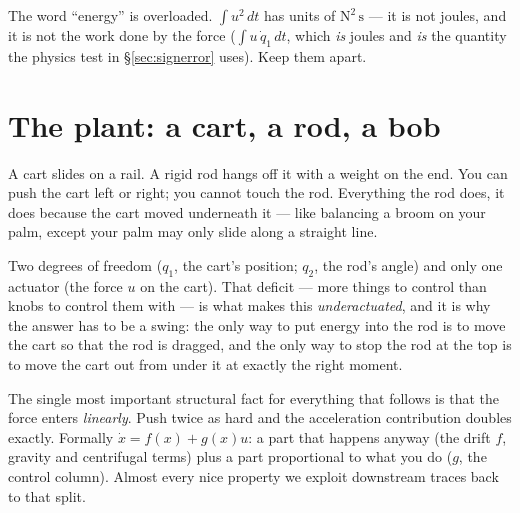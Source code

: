 \documentclass[11pt]{article}
\begin{document}
\begin{warn}
The word ``energy'' is overloaded. $\int u^2\,dt$ has units of
$\mathrm{N^2\,s}$ --- it is not joules, and it is not the work done by the
force ($\int u\,\dot q_1\,dt$, which \emph{is} joules and \emph{is} the quantity
the physics test in \S\ref{sec:signerror} uses). Keep them apart.
\end{warn}

\section{The plant: a cart, a rod, a bob}

\begin{eli}
A cart slides on a rail. A rigid rod hangs off it with a weight on the end. You
can push the cart left or right; you cannot touch the rod. Everything the rod
does, it does because the cart moved underneath it --- like balancing a broom on
your palm, except your palm may only slide along a straight line.
\end{eli}

\begin{intu}
Two degrees of freedom ($q_1$, the cart's position; $q_2$, the rod's angle) and
only one actuator (the force $u$ on the cart). That deficit --- more things to
control than knobs to control them with --- is what makes this
\emph{underactuated}, and it is why the answer has to be a swing: the only way to
put energy into the rod is to move the cart so that the rod is dragged, and the
only way to stop the rod at the top is to move the cart out from under it at
exactly the right moment.

The single most important structural fact for everything that follows is that
the force enters \emph{linearly}. Push twice as hard and the acceleration
contribution doubles exactly. Formally $\dot x = f(x)+g(x)u$: a part that happens
anyway (the drift $f$, gravity and centrifugal terms) plus a part proportional
to what you do ($g$, the control column). Almost every nice property we exploit
downstream traces back to that split.
\end{intu}
\end{document}
